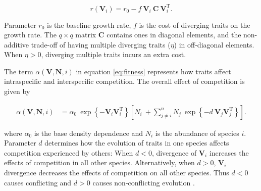 \begin{equation} \label{eq:growth-rate}
    r(\mathbf{V}_i) = r_0 - f ~ \mathbf{V}_i ~ \mathbf{C} ~ \mathbf{V}_{i}^{\text{T}} \text{.}
\end{equation}

Parameter $r_0$ is the baseline growth rate,
$f$ is the cost of diverging traits on the growth rate.
The $q \times q$ matrix $\mathbf{C}$ contains ones in diagonal elements, and the
non-additive trade-off of having multiple diverging traits ($\eta$) in off-diagonal
elements.
When $\eta > 0$, diverging multiple traits incurs an extra cost.


The term $\alpha(\mathbf{V}, \mathbf{N}, i)$ in
equation \ref{eq:fitness} represents how traits affect
intraspecific and interspecific competition.
The overall effect of competition is given by

\begin{equation} \label{eq:competition}
\begin{align}
    \alpha(\mathbf{V}, \mathbf{N}, i) &=
        \alpha_0 ~ \exp \left\{- \mathbf{V}_i
        \mathbf{V}_i^{\text{T}} \right\}
        \left[ N_i ~ +
        \sum_{j \ne i}^{n}{
            N_j ~
            \exp \left\{- d ~ \mathbf{V}_j \mathbf{V}_j^{\text{T}} \right\} }
        \right]
    \text{.}
\end{align}
\end{equation}

where
$\alpha_0$ is the base density dependence and
$N_i$ is the abundance of species $i$.
Parameter $d$ determines how the evolution of traits in one species affects
competition experienced by others:
When $d < 0$, divergence of $\mathbf{V}_i$ increases the effects of competition in
all other species.
Alternatively, when $d > 0$, $\mathbf{V}_i$ divergence decreases the effects of
competition on all other species.
Thus $d < 0$ causes conflicting and $d > 0$ causes non-conflicting
evolution \citep{Northfield:2013if}.


%


